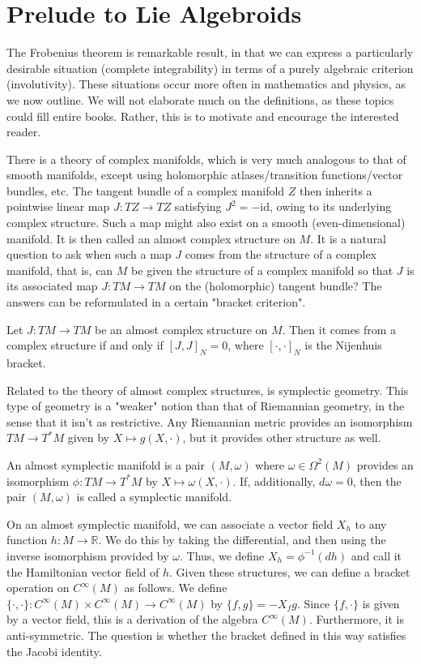 \section{Prelude to Lie Algebroids}

The Frobenius theorem is remarkable result, in that we can express a particularly desirable situation (complete integrability) in terms of a purely algebraic criterion (involutivity). These situations occur more often in mathematics and physics, as we now outline. We will not elaborate much on the definitions, as these topics could fill entire books. Rather, this is to motivate and encourage the interested reader.\par 
There is a theory of complex manifolds, which is very much analogous to that of smooth manifolds, except using holomorphic atlases/transition functions/vector bundles, etc. The tangent bundle of a complex manifold $Z$ then inherits a pointwise linear map $J:TZ\to TZ$ satisfying $J^2=-\text{id}$, owing to its underlying complex structure. Such a map might also exist on a smooth (even-dimensional) manifold. It is then called an almost complex structure on $M$. It is a natural question to ask when such a map $J$ comes from the structure of a complex manifold, that is, can $M$ be given the structure of a complex manifold so that $J$ is its associated map $J:TM\to TM$ on the (holomorphic) tangent bundle? The answers can be reformulated in a certain "bracket criterion". 
\begin{theorem}
  Let $J:TM\to TM$ be an almost complex structure on $M$. Then it comes from a complex structure if and only if $[J,J]_N=0$, where $[\cdot,\cdot]_N$ is the Nijenhuis bracket.
\end{theorem}
Related to the theory of almost complex structures, is symplectic geometry. This type of geometry is a "weaker" notion than that of Riemannian geometry, in the sense that it isn't as restrictive. Any Riemannian metric provides an isomorphism $TM\to T^*M$ given by $X\mapsto g(X,\cdot)$, but it provides other structure as well. 
\begin{definition}
  An almost symplectic manifold is a pair $(M,\omega)$ where $\omega\in\Omega^2(M)$ provides an isomorphism $\phi:TM\to T^*M$ by $X\mapsto \omega(X,\cdot)$. If, additionally, $d\omega=0$, then the pair $(M,\omega)$ is called a symplectic manifold.
\end{definition}
On an almost symplectic manifold, we can associate a vector field $X_h$ to any function $h:M\to\mathbb{R}$. We do this by taking the differential, and then using the inverse isomorphism provided by $\omega$. Thus, we define $X_h=\phi^{-1}(dh)$ and call it the Hamiltonian vector field of $h$. Given these structures, we can define a bracket operation on $C^\infty(M)$ as follows. We define $\{\cdot,\cdot\}:C^\infty(M)\times C^\infty(M)\to C^\infty(M)$ by $\{f,g\}=-X_fg$. Since $\{f,\cdot\}$ is given by a vector field, this is a derivation of the algebra $C^\infty(M)$. Furthermore, it is anti-symmetric. The question is whether the bracket defined in this way satisfies the Jacobi identity. 
